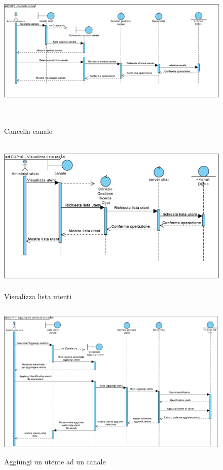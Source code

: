 \begin{figure}
	\centering
	\includegraphics[height=3in,width=5in]{imgs/gruppo6/sequence/CUP9_cancella_canale.pdf}
	\caption{Cancella canale}
	\label{fig:prova}
\end{figure}

\begin{figure}
	\centering
	\includegraphics[height=3in,width=5in]{imgs/gruppo6/sequence/CUP10_visualizza_lista_utenti.pdf}
	\caption{Visualizza lista utenti}
	\label{fig:prova}
\end{figure}

\begin{figure}
	\centering
	\includegraphics[height=3in,width=5in]{imgs/gruppo6/sequence/CUP11_aggiungi_un_utente_ad_un_canale.pdf}
	\caption{Aggiungi un utente ad un canale}
	\label{fig:prova}
\end{figure}

